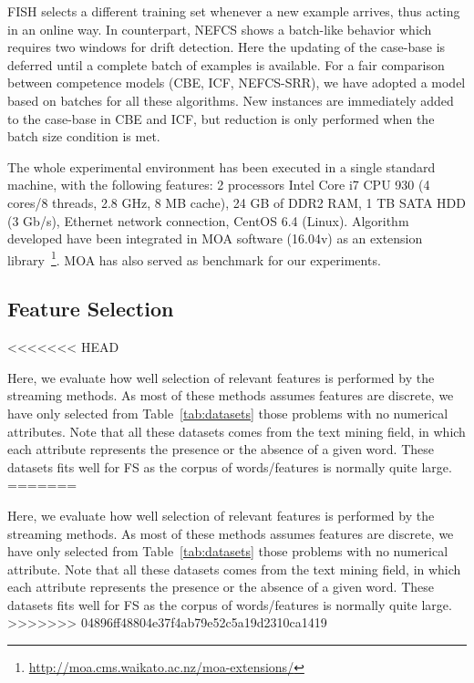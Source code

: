 \documentclass[preprint,12pt]{elsarticle}
\begin{document}
\begin{itemize}
FISH selects a different training set whenever a new example arrives, thus acting in an online way. In counterpart, NEFCS shows a batch-like behavior which requires two windows for drift detection. Here the updating of the case-base is deferred until a complete batch of examples is available. For a fair comparison between competence models (CBE, ICF, NEFCS-SRR), we have adopted a model based on batches for all these algorithms. New instances are immediately added to the case-base in CBE and ICF, but reduction is only performed when the batch size condition is met. 

The whole experimental environment has been executed in a single standard machine, with the following features: 2 processors Intel Core i7 CPU 930 (4 cores/8 threads, 2.8 GHz, 8 MB cache), 24 GB of DDR2 RAM, 1 TB SATA HDD (3 Gb/s), Ethernet network connection, CentOS 6.4 (Linux). Algorithm developed have been integrated in MOA software (16.04v) as an extension library~\footnote{\url{http://moa.cms.waikato.ac.nz/moa-extensions/}}. MOA has also served as benchmark for our experiments.

%

\subsection{\textbf{Feature Selection}}
<<<<<<< HEAD
\label{subsec:exp-fsel}

Here, we evaluate how well selection of relevant features is performed by the streaming methods. As most of these methods assumes features are discrete, we have only selected from Table~\ref{tab:datasets} those problems with no numerical attributes. Note that all these datasets comes from the text mining field, in which each attribute represents the presence or the absence of a given word. These datasets fits well for FS as the corpus of words/features is normally quite large.
=======
\label{subsec:fsel}

Here, we evaluate how well selection of relevant features is performed by the streaming methods. As most of these methods assumes features are discrete, we have only selected from Table~\ref{tab:datasets} those problems with no numerical attribute. Note that all these datasets comes from the text mining field, in which each attribute represents the presence or the absence of a given word. These datasets fits well for FS as the corpus of words/features is normally quite large.
>>>>>>> 04896ff48804e37f4ab79e52c5a19d2310ca1419


\end{itemize}
\end{document}
